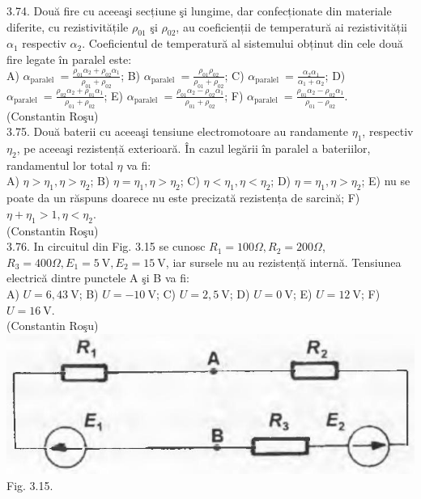 3.74. Două fire cu aceeaşi secțiune şi lungime, dar confecționate din materiale diferite, cu rezistivitățile $\rho_{01}$ şi $\rho_{02}$, au coeficienții de temperatură ai rezistivității $\alpha_{1}$ respectiv $\alpha_{2}$. Coeficientul de temperatură al sistemului obținut din cele două fire legate în paralel este:\\ A) $\alpha_{\text {paralel }}=\frac{\rho_{01} \alpha_{2}+\rho_{02} \alpha_{1}}{\rho_{01}+\rho_{02}}$; B) $\alpha_{\text {paralel }}=\frac{\rho_{01} \rho_{02}}{\rho_{01}+\rho_{02}}$; C) $\alpha_{\text {paralel }}=\frac{\alpha_{2} \alpha_{1}}{\alpha_{1}+\alpha_{2}}$; D) $\alpha_{\text {paralel }}=\frac{\rho_{02} \alpha_{2}+\rho_{01} \alpha_{1}}{\rho_{01}+\rho_{02}}$; E) $\alpha_{\text {paralel }}=\frac{\rho_{01} \alpha_{2}-\rho_{02} \alpha_{1}}{\rho_{01}+\rho_{02}}$; F) $\alpha_{\text {paralel }}=\frac{\rho_{01} \alpha_{2}-\rho_{02} \alpha_{1}}{\rho_{01}-\rho_{02}}$.\\ (Constantin Roşu)\\

3.75. Două baterii cu aceeaşi tensiune electromotoare au randamente $\eta_{1}$, respectiv $\eta_{2}$, pe aceeaşi rezistență exterioară. În cazul legării în paralel a bateriilor, randamentul lor total $\eta$ va fi:\\ A) $\eta>\eta_{1} , \eta>\eta_{2}$; B) $\eta=\eta_{1} , \eta>\eta_{2}$; C) $\eta<\eta_{1} , \eta<\eta_{2}$; D) $\eta=\eta_{1} , \eta>\eta_{2}$; E) nu se poate da un răspuns doarece nu este precizată rezistența de sarcină; F) $\eta+\eta_{1}>1 , \eta<\eta_{2}$.\\ (Constantin Roşu)\\

3.76. In circuitul din Fig. 3.15 se cunosc $R_{1}=100 \Omega, R_{2}=200 \Omega$, $R_{3}=400 \Omega, E_{1}=5 \mathrm{~V}, E_{2}=15 \mathrm{~V}$, iar sursele nu au rezistență internă. Tensiunea electrică dintre punctele A şi B va fi:\\ A) $U=6,43 \mathrm{~V}$; B) $U=-10 \mathrm{~V}$; C) $U=2,5 \mathrm{~V}$; D) $U=0 \mathrm{~V}$; E) $U=12 \mathrm{~V}$; F) $U=16 \mathrm{~V}$.\\ (Constantin Roşu)\\ \includegraphics[width=0.4\linewidth]{images/2025_07_01_5b3ff9fa0d508c8e9f17g-160} Fig. 3.15.\\

